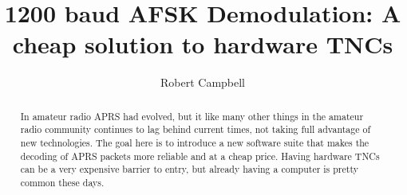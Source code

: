 \documentclass{report}
\begin{document}
\title{1200 baud AFSK Demodulation: A cheap solution to hardware TNCs}
\author{Robert Campbell}
\maketitle

\begin{abstract}
In amateur radio APRS had evolved, but it like many other things in the
amateur radio community continues to lag behind current times, not taking
full advantage of new technologies. The goal here is to introduce a new
software suite that makes the decoding of APRS packets more reliable and
at a cheap price. Having hardware TNCs can be a very expensive barrier to
entry, but already having a computer is pretty common these days.
\end{abstract}

\tableofcontents


\end{document}
